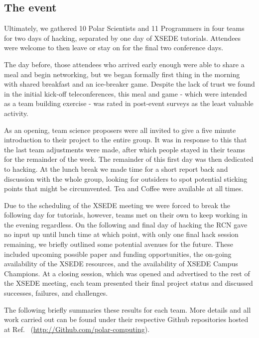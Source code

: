 \documentclass[conference]{IEEEtran}
\begin{document}
\subsection{The event}
Ultimately, we gathered 10 Polar Scientists and 11 Programmers in four teams for two days of hacking, separated by one day of XSEDE tutorials. Attendees were welcome to then leave or stay on for the final two conference days.  

The day before, those attendees who arrived early enough were able to share a meal and begin networking, but we began formally first thing in the morning with shared breakfast and an ice-breaker game. Despite the lack of trust we found in the initial kick-off teleconferences, this meal and game - which were intended as a team building exercise - was rated in post-event surveys as the least valuable activity.

As an opening, team science proposers were all invited to give a five minute introduction to their project to the entire group. It was in response to this that the last team adjustments were made, after which people stayed in their teams for the remainder of the week. The remainder of this first day was then dedicated to hacking.  At the lunch break we made time for a short report back and discussion with the whole group, looking for outsiders to spot potential sticking points that might be circumvented.  Tea and Coffee were available at all times.

Due to the scheduling of the XSEDE meeting we were forced to break the following day for tutorials, however, teams met on their own to keep working in the evening regardless. On the following and final day of hacking the RCN gave no input up until lunch time at which point, with only one final hack session remaining, we briefly outlined some potential avenues for the future. These included upcoming possible paper and funding opportunities, the on-going availability of the XSEDE resources, and the availability of XSEDE Campus Champions. At a closing session, which was opened and advertised to the rest of the XSEDE meeting, each team presented their final project status and discussed successes, failures, and challenges.

The following briefly summaries these results for each team.  More details and all work carried out can be found under their respective Github repositories hosted at Ref.~\cite{polar-computing-Github} (\url{http://Github.com/polar-computing}). 
\end{document}
